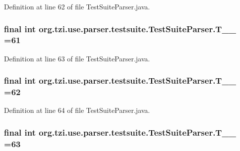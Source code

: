 Definition at line 62 of file Test\-Suite\-Parser.\-java.

\hypertarget{classorg_1_1tzi_1_1use_1_1parser_1_1testsuite_1_1_test_suite_parser_a06505389cd512a337cee6844d42d253c}{
\subsubsection[{T\-\_\-\-\_\-61}]{\setlength{\rightskip}{0pt plus 5cm}final int org.\-tzi.\-use.\-parser.\-testsuite.\-Test\-Suite\-Parser.\-T\-\_\-\-\_ =61\hspace{0.3cm}{\ttfamily [static]}}}\label{classorg_1_1tzi_1_1use_1_1parser_1_1testsuite_1_1_test_suite_parser_a06505389cd512a337cee6844d42d253c}


Definition at line 63 of file Test\-Suite\-Parser.\-java.

\hypertarget{classorg_1_1tzi_1_1use_1_1parser_1_1testsuite_1_1_test_suite_parser_a2fed17e981de7b40de7d2b28df143ac5}{
\subsubsection[{T\-\_\-\-\_\-62}]{\setlength{\rightskip}{0pt plus 5cm}final int org.\-tzi.\-use.\-parser.\-testsuite.\-Test\-Suite\-Parser.\-T\-\_\-\-\_ =62\hspace{0.3cm}{\ttfamily [static]}}}\label{classorg_1_1tzi_1_1use_1_1parser_1_1testsuite_1_1_test_suite_parser_a2fed17e981de7b40de7d2b28df143ac5}


Definition at line 64 of file Test\-Suite\-Parser.\-java.

\hypertarget{classorg_1_1tzi_1_1use_1_1parser_1_1testsuite_1_1_test_suite_parser_af06cefabb5aac46b2418c2bc61ed8e73}{
\subsubsection[{T\-\_\-\-\_\-63}]{\setlength{\rightskip}{0pt plus 5cm}final int org.\-tzi.\-use.\-parser.\-testsuite.\-Test\-Suite\-Parser.\-T\-\_\-\-\_ =63\hspace{0.3cm}{\ttfamily [static]}}}\label{classorg_1_1tzi_1_1use_1_1parser_1_1testsuite_1_1_test_suite_parser_af06cefabb5aac46b2418c2bc61ed8e73}


